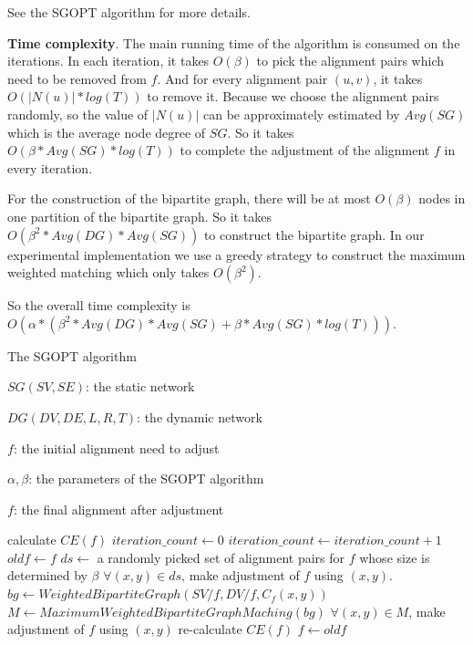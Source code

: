\documentclass{bioinfo}
\theoremstyle{definition}
\begin{document}
\begin{methods}
See the SGOPT algorithm for more details.



\textbf{Time complexity}. The main running time of the algorithm is consumed on the iterations. In each iteration, it takes $O(\beta)$ to pick the alignment pairs which need to be removed from $f$. And for every alignment pair $(u,v)$, it takes $O(|N(u)|*log(T))$ to remove it. Because we choose the alignment pairs randomly, so the value of $|N(u)|$ can be approximately estimated by $Avg(SG)$ which is the average node degree of $SG$. So it takes $O(\beta*Avg(SG)*log(T))$ to complete the adjustment of the alignment $f$ in every iteration.

For the construction of the bipartite graph, there will be at most $O(\beta)$ nodes in one partition of the bipartite graph. So it takes $O(\beta^2*Avg(DG)*Avg(SG))$ to construct the bipartite graph. In our experimental implementation we use a greedy strategy to construct the maximum weighted matching which only takes $O(\beta^2)$.

So the overall time complexity is $O(\alpha*(\beta^2*Avg(DG)*Avg(SG)+\beta*Avg(SG)*log(T)))$.
\begin{algorithm}[!tpb]
    {
    \caption{The SGOPT algorithm}
    \label{alg:1}
        \begin{algorithmic}[1]
        \Require
        $SG(SV,SE)$: the static network
        
        $DG(DV,DE,L,R,T)$: the dynamic network 
        
        $f$: the initial alignment need to adjust
        
        $\alpha,\beta$: the parameters of the SGOPT algorithm
        
        \Ensure
        $f$: the final alignment after adjustment
        
        \State calculate $CE(f)$
        \State $iteration\_count \gets 0$
            \State $iteration\_count\gets iteration\_count+1$
            \State $oldf\gets f$
            \State $ds\gets$ a randomly picked set of alignment pairs for $f$ whose size is determined by $\beta$
            \State $\forall (x,y)\in ds$, make adjustment of $f$ using $(x,y)$.
            \State $bg\gets WeightedBipartiteGraph(SV/f,DV/f,C_f(x,y))$
            \State $M\gets MaximumWeightedBipartiteGraphMaching(bg)$
            \State $\forall (x,y)\in M$, make adjustment of $f$ using $(x,y)$
            \State re-calculate $CE(f)$
                \State $f\gets oldf$
            \EndIf
        \EndWhile
        \end{algorithmic}    
    }
    \end{algorithm}
\end{methods}
\end{document}
